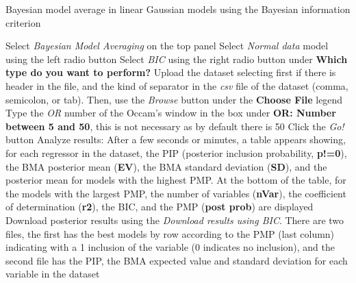 \begin{algorithm}[h!]
	\caption{Bayesian model average in linear Gaussian models using the Bayesian information criterion}\label{alg:BMAnormalBIC}
	\begin{algorithmic}[1]  		 			
		\State Select \textit{Bayesian Model Averaging} on the top panel
		\State Select \textit{Normal data} model using the left radio button
		\State Select \textit{BIC} using the right radio button under \textbf{Which type do you want to perform?}
		\State Upload the dataset selecting first if there is header in the file, and the kind of separator in the \textit{csv} file of the dataset (comma, semicolon, or tab). Then, use the \textit{Browse} button under the \textbf{Choose File} legend
		\State Type the \textit{OR} number of the Occam's window in the box under \textbf{OR: Number between 5 and 50}, this is not necessary as by default there is 50
		\State Click the \textit{Go!} button
		\State Analyze results: After a few seconds or minutes, a table appears showing, for each regressor in the dataset, the PIP (posterior inclusion probability, \textbf{p!=0}), the BMA posterior mean (\textbf{EV}), the BMA standard deviation (\textbf{SD}), and the posterior mean for models with the highest PMP. At the bottom of the table, for the models with the largest PMP, the number of variables (\textbf{nVar}), the coefficient of determination (\textbf{r2}), the BIC, and the PMP (\textbf{post prob}) are displayed
		\State Download posterior results using the \textit{Download results using BIC}. There are two files, the first has the best models by row according to the PMP (last column) indicating with a 1 inclusion of the variable (0 indicates no inclusion), and the second file has the PIP, the BMA expected value and standard deviation for each variable in the dataset
	\end{algorithmic} 
\end{algorithm}


